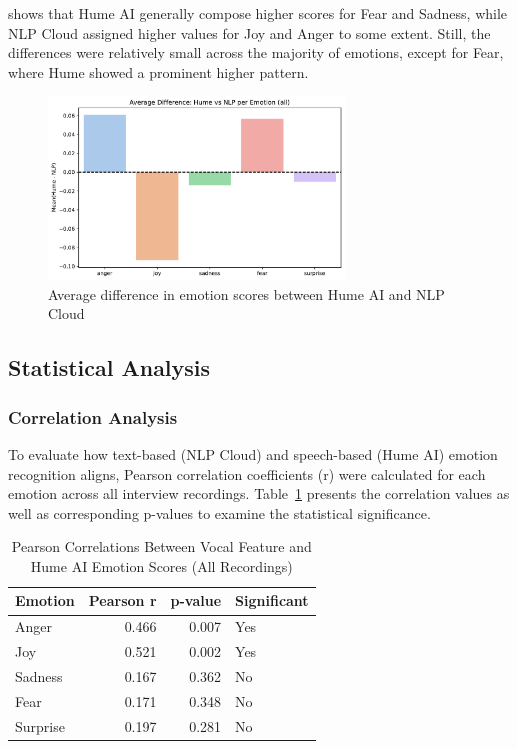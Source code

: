 shows that Hume AI generally compose higher scores for Fear and Sadness, while NLP Cloud assigned higher values for 
Joy and Anger to some extent. Still, the differences were relatively small across the majority of emotions, 
except for Fear, where Hume showed a prominent higher pattern. 

\begin{figure}[!h]
    \centering
    \includegraphics[width=0.7\textwidth]{png/results/rq2/hume_nlp_difference_all.pdf}
    \caption{Average difference in emotion scores between Hume AI and NLP Cloud}
    \label{fig:comp_bar_full_rq2}
\end{figure}

\newpage
\subsection{Statistical Analysis}
\subsubsection{Correlation Analysis}

To evaluate how text-based (NLP Cloud) and speech-based (Hume AI) emotion recognition aligns, Pearson correlation coefficients (r) were calculated for each emotion across all interview recordings. 
Table~\ref{tab:corr_all} presents the correlation values as well as corresponding p-values to examine the statistical significance. 

\begin{table}[H]
    \centering
    \caption{Pearson Correlations Between Vocal Feature and Hume AI Emotion Scores (All Recordings)}
    \label{tab:corr_all}
    \begin{tabular}{lrrl}
      \toprule
      \textbf{Emotion} & \textbf{Pearson r} & \textbf{p-value} & \textbf{Significant}\\
      \midrule
      Anger    & 0.466 & 0.007 & Yes \\
      Joy      & 0.521 & 0.002 & Yes \\
      Sadness  & 0.167 & 0.362 & No  \\
      Fear     & 0.171 & 0.348 & No  \\
      Surprise & 0.197 & 0.281 & No  \\
      \bottomrule
    \end{tabular}
  \end{table}


